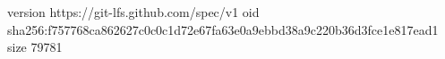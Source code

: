 version https://git-lfs.github.com/spec/v1
oid sha256:f757768ca862627c0c0c1d72e67fa63e0a9ebbd38a9c220b36d3fce1e817ead1
size 79781
